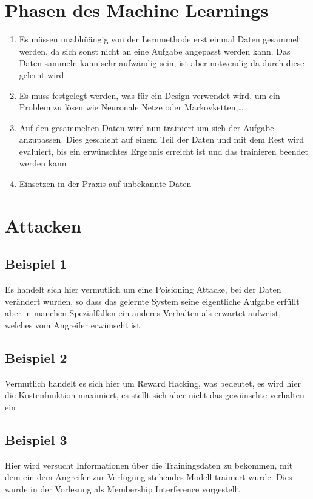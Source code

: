 \documentclass[a4paper,12pt,
headsepline,           %
twoside,               %
pointlessnumbers,      %
bibtotoc,              %
BCOR15mm               %
]{scrbook}
\begin{document}
\section*{Phasen des Machine Learnings}
\begin{enumerate}
    \item Es müssen unabhüängig von der Lernmethode erst einmal Daten gesammelt werden, da sich sonst nicht an eine Aufgabe angepasst werden kann. Das Daten sammeln kann sehr aufwändig sein, ist aber notwendig da durch diese gelernt wird
    \item Es muss festgelegt werden, was für ein Design verwendet wird, um ein Problem zu lösen wie Neuronale Netze oder Markovketten,\dots
    \item Auf den gesammelten Daten wird nun trainiert um sich der Aufgabe anzupassen. Dies geschieht auf einem Teil der Daten und mit dem Rest wird evaluiert, bis ein erwünschtes Ergebnis erreicht ist und das trainieren beendet werden kann
    \item Einsetzen in der Praxis auf unbekannte Daten
\end{enumerate}

\section*{Attacken}
\subsection*{Beispiel 1}
Es handelt sich hier vermutlich um eine Poisioning Attacke, bei der Daten verändert wurden, so dass das gelernte System seine eigentliche Aufgabe erfüllt aber in manchen Spezialfällen ein anderes Verhalten als erwartet aufweist, welches vom Angreifer erwünscht ist
\subsection*{Beispiel 2}
Vermutlich handelt es sich hier um Reward Hacking, was bedeutet, es wird hier die Kostenfunktion maximiert, es stellt sich aber nicht das gewünschte verhalten ein
\subsection*{Beispiel 3}
Hier wird versucht Informationen über die Trainingsdaten zu bekommen, mit dem ein dem Angreifer zur Verfügung stehendes Modell trainiert wurde. Dies wurde in der Vorlesung als Membership Interference vorgestellt
\end{document}
